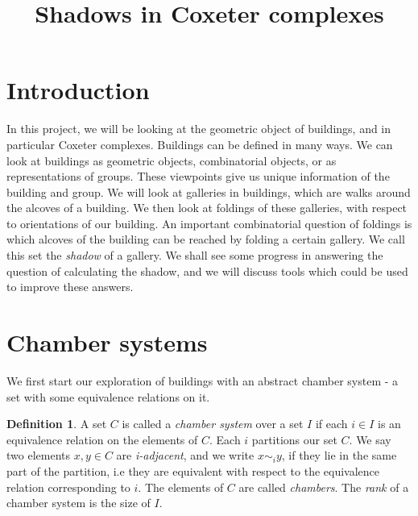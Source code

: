 \documentclass[11pt]{article}
\begin{document}
\newtheorem{theorem}{Theorem}
\theoremstyle{definition}
\newtheorem{definition}{Definition}
\newtheorem{proposition}{Proposition}
\newtheorem{example}{Example}
\newtheorem{lemma}{Lemma}
\newtheorem{corollary}{Corollary}
\newcommand{\uw}{\mathcal{U}(W,X)}
\newcommand{\W}{$(W,S)$}
\newcommand{\ix}{\textit}
\newcommand{\tr}{\textcolor{red}}
\newcommand{\sg}{$\Sigma$}


\title{Shadows in Coxeter complexes}
\maketitle
\tableofcontents


\section{Introduction}

In this project, we will be looking at the geometric object of buildings, and in particular Coxeter complexes. Buildings can be defined in many ways. We can look at buildings as geometric objects, combinatorial objects, or as representations of groups. These viewpoints give us unique information of the building and group. We will look at galleries in buildings, which are walks around the alcoves of a building. We then look at foldings of these galleries, with respect to orientations of our building. An important combinatorial question of foldings is which alcoves of the building can be reached by folding a certain gallery. We call this set the \ix{shadow} of a gallery. We shall see some progress in answering the question of calculating the shadow, and we will discuss tools which could be used to improve these answers. 


\section{Chamber systems}
We first start our exploration of buildings with an abstract chamber system - a set with some equivalence relations on it.  

\begin{definition}
    A set $C$ is called a \ix{chamber system} over a set $I$ if each $i\in I$ is an equivalence relation on the elements of $C$. Each $i$ partitions our set $C$. We say two elements $x,y\in C$ are \ix{i-adjacent}, and we write $x\sim_{i} y$, if they lie in the same part of the partition, i.e they are equivalent with respect to the equivalence relation corresponding to $i$. The elements of $C$ are called \ix{chambers}. The \ix{rank} of a chamber system is the size of $I$. 
\end{definition}
\end{document}
